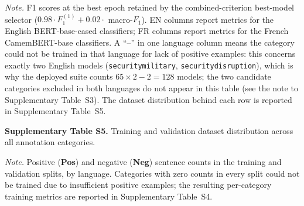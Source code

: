 \documentclass[12pt]{article}
\makeatletter
\let\CCFlandscape@orig\landscape
\renewcommand{\landscape}{%
  \CCFlandscape@orig
  \setlength{\textwidth}{\dimexpr\paperheight-5cm\relax}%
  \setlength{\linewidth}{\textwidth}%
  \setlength{\hsize}{\textwidth}%
  \setlength{\columnwidth}{\textwidth}%
}
\renewcommand\_{\texttt{\detokenize{_}\allowbreak}}
\makeatother
\begin{document}
{\footnotesize

}

\vspace{0.5em}
\noindent\footnotesize
\textit{Note.} F1 scores at the best epoch retained by the combined-criterion best-model selector ($0.98 \cdot F_1^{(1)} + 0.02 \cdot$ macro-$F_1$). EN columns report metrics for the English BERT-base-cased classifiers; FR columns report metrics for the French CamemBERT-base classifiers. A ``--'' in one language column means the category could not be trained in that language for lack of positive examples: this concerns exactly two English models (\texttt{security\_military}, \texttt{security\_disruption}), which is why the deployed suite counts $65 \times 2 - 2 = 128$ models; the two candidate categories excluded in both languages do not appear in this table (see the note to Supplementary Table~S3). The dataset distribution behind each row is reported in Supplementary Table~S5.

\endlandscape

\landscape
\noindent\textbf{Supplementary Table S5.} Training and validation dataset distribution across all annotation categories.
\vspace{0.5em}

{\footnotesize

}

\vspace{0.5em}
\noindent\footnotesize
\textit{Note.} Positive (\textbf{Pos}) and negative (\textbf{Neg}) sentence counts in the training and validation splits, by language. Categories with zero counts in every split could not be trained due to insufficient positive examples; the resulting per-category training metrics are reported in Supplementary Table~S4.

\endlandscape
\end{document}
